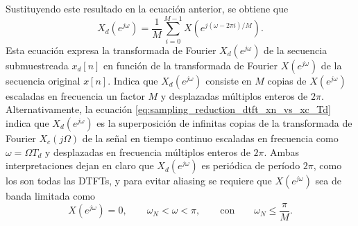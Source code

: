 \documentclass[a4paper]{report}
\begin{document}
Sustituyendo este resultado en la ecuación anterior, se obtiene que 
\begin{equation}\label{eq:sampling_reduction_dtft_xnM_vs_xn}
 X_d(e^{j\omega})=\frac{1}{M}\sum_{i=0}^{M-1}X(e^{j(\omega-2\pi i)/M}).
\end{equation}
Esta ecuación expresa la transformada de Fourier \(X_d(e^{j\omega})\) de la secuencia submuestreada \(x_d[n]\) en función de la transformada de Fourier  \(X(e^{j\omega})\) de la secuencia original \(x[n]\).
Indica que \( X_d(e^{j\omega})\) consiste en \(M\) copias de \(X(e^{j\omega})\) escaladas en frecuencia un factor \(M\) y desplazadas múltiplos enteros de \(2\pi\). Alternativamente, la ecuación \ref{eq:sampling_reduction_dtft_xn_vs_xc_Td} indica que \(X_d(e^{j\omega})\) es la superposición de infinitas copias de la transformada de Fourier \(X_c(j\Omega)\) de la señal en tiempo continuo escaladas en frecuencia como \(\omega=\Omega T_d\) y desplazadas en frecuencia múltiplos enteros de \(2\pi\). Ambas interpretaciones dejan en claro que \(X_d(e^{j\omega})\) es periódica de período \(2\pi\), como los son todas las DTFTs, y para evitar aliasing se requiere que \(X(e^{j\omega})\) sea de banda limitada como
\[
 X(e^{j\omega})=0,
 \qquad 
 \omega_N<\omega<\pi,
 \qquad\textrm{con}\qquad
 \omega_N\leq\frac{\pi}{M}.
\]
\end{document}
